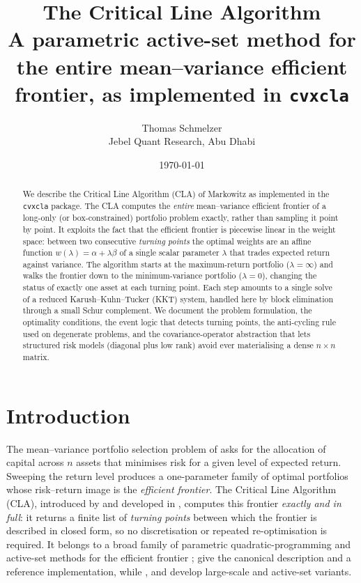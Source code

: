 \documentclass[11pt]{article}
\title{\textbf{The Critical Line Algorithm}\\[0.3em]
\large A parametric active-set method for the entire mean--variance efficient frontier,
as implemented in \texttt{cvxcla}}
\author{Thomas Schmelzer\\[2pt]
\normalsize Jebel Quant Research, Abu Dhabi}
\date{\today}
\begin{document}
\maketitle

\begin{abstract}
We describe the Critical Line Algorithm (CLA) of Markowitz as implemented in the
\texttt{cvxcla} package. The CLA computes the \emph{entire} mean--variance
efficient frontier of a long-only (or box-constrained) portfolio problem exactly,
rather than sampling it point by point. It exploits the fact that the efficient
frontier is piecewise linear in the weight space: between two consecutive
\emph{turning points} the optimal weights are an affine function $w(\lambda) =
\alpha + \lambda\beta$ of a single scalar parameter $\lambda$ that trades expected
return against variance. The algorithm starts at the maximum-return portfolio
($\lambda=\infty$) and walks the frontier down to the minimum-variance portfolio
($\lambda=0$), changing the status of exactly one asset at each turning point.
Each step amounts to a single solve of a reduced Karush--Kuhn--Tucker (KKT) system,
handled here by block elimination through a small Schur complement. We document the
problem formulation, the optimality conditions, the event logic that detects
turning points, the anti-cycling rule used on degenerate problems, and the
covariance-operator abstraction that lets structured risk models (diagonal plus
low rank) avoid ever materialising a dense $n\times n$ matrix.
\end{abstract}

\tableofcontents

\section{Introduction}

The mean--variance portfolio selection problem of \citet{markowitz1952} asks for the
allocation of capital across $n$ assets that minimises risk for a given level of
expected return. Sweeping the return level produces a one-parameter family of optimal
portfolios whose risk--return image is the \emph{efficient frontier}. The Critical
Line Algorithm (CLA), introduced by \citet{markowitz1956} and developed in
\citet{markowitz1959}, computes this frontier \emph{exactly and in full}: it returns a
finite list of \emph{turning points} between which the frontier is described in closed
form, so no discretisation or repeated re-optimisation is required. It belongs to a
broad family of parametric quadratic-programming and active-set methods for the
efficient frontier \citep{wolfe1959, perold1984, niedermayer2010, bailey2013};
\citet{markowitz2000} give the canonical description and a reference implementation,
while \citet{perold1984}, \citet{stein2008} and \citet{hirschberger2010} develop
large-scale and active-set variants.
\end{document}
